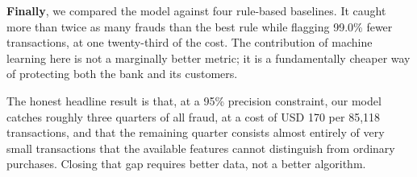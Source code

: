 \textbf{Finally}, we compared the model against four rule-based baselines. It
caught more than twice as many frauds than the best rule while flagging 99.0\%
fewer transactions, at one twenty-third of the cost. The contribution of
machine learning here is not a marginally better metric; it is a fundamentally
cheaper way of protecting both the bank and its customers.

The honest headline result is that, at a 95\% precision constraint, our model
catches roughly three quarters of all fraud, at a cost of USD 170 per 85{,}118
transactions, and that the remaining quarter consists almost entirely of very
small transactions that the available features cannot distinguish from
ordinary purchases. Closing that gap requires better data, not a better
algorithm.
